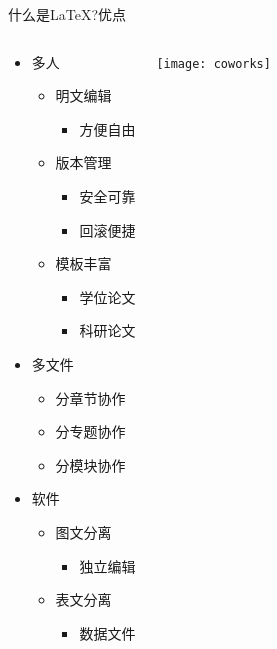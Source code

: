 \documentclass[xcolor=svgnames, t]{ctexbeamer}
\begin{document}
\begin{frame}[t]{什么是\LaTeX?}{优点}
  \vspace{-3ex}
  \begin{columns}%
  \begin{spacing}{0.7}
    \begin{itemize}
    \item \alert{多人}
      \begin{itemize}
      \item 明文编辑
        \begin{itemize}
        \item 方便自由
        \end{itemize}
      \item 版本管理
        \begin{itemize}
        \item 安全可靠
        \item 回滚便捷
        \end{itemize}
      \item 模板丰富
        \begin{itemize}
        \item 学位论文
        \item 科研论文
        \end{itemize}
      \end{itemize}
    \item \alert{多文件}
      \begin{itemize}
      \item 分章节协作
      \item 分专题协作
      \item 分模块协作
      \end{itemize}
    \item \alert{软件}
      \begin{itemize}
      \item 图文分离
        \begin{itemize}
        \item 独立编辑
        \end{itemize}
      \item 表文分离
        \begin{itemize}
        \item 数据文件
        \end{itemize}
      \end{itemize}
    \end{itemize}
  \end{spacing}
  \begin{center}
    \texttt{[image: coworks]}
  \end{center}
\end{columns}
\end{frame}
\end{document}
